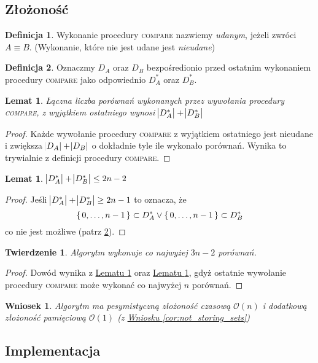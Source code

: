 \documentclass{scrartcl}
\theoremstyle{definition}
\theoremstyle{plain}
\theoremstyle{remark}
\theoremstyle{plain}
\theoremstyle{definition}
\newtheorem{def_success_compare}{Definicja}[section]
\newtheorem{def_D_star}[def_success_compare]{Definicja}
\theoremstyle{plain}
\newtheorem{lemma_unsuccesful_comparisons}
[lemma_equiv_if_lex_min_eq]{Lemat}
\newtheorem{lemma_d_star_len}[lemma_equiv_if_lex_min_eq]{Lemat}
\newtheorem{complexity_theorem}[termination_theorem]{Twierdzenie}
\newtheorem{o_complexity}[not_storing_sets]{Wniosek}
\begin{document}
\subsection{Złożoność}
\begin{def_success_compare}
	\label{def:success_compare}
	Wykonanie procedury \textnormal{\textsc{compare}}
	nazwiemy \emph{udanym}, jeżeli zwróci \(A\equiv B\).
	(Wykonanie, które nie jest udane jest \emph{nieudane})
\end{def_success_compare}
\begin{def_D_star}
	\label{def:D_star}
	Oznaczmy \(D_A\) oraz \(D_B\)
	bezpośredionio przed ostatnim wykonaniem
	procedury \textnormal{\textsc{compare}}
	jako odpowiednio \(D_A^*\) oraz \(D_B^*\).
\end{def_D_star}
\begin{lemma_unsuccesful_comparisons}
	\label{lem:unsuccesful_comparisons}
	Łączna liczba porównań wykonanych przez
	wywołania procedury \textnormal{\textsc{compare}},
	z wyjątkiem ostatniego wynosi
	\(\abs{D_A^*}+\abs{D_B^*}\)
\end{lemma_unsuccesful_comparisons}
\begin{proof}
	Każde wywołanie procedury \textsc{compare}
	z wyjątkiem ostatniego jest nieudane
	i zwiększa \(\abs{D_A}+\abs{D_B}\)
	o dokładnie tyle ile wykonało porównań.
	Wynika to trywialnie z definicji
	procedury \textsc{compare}.
\end{proof}
\begin{lemma_d_star_len}
	\label{lem:d_star_len}
	\(\abs{D_A^*}+\abs{D_B^*}\leq2n-2\)
\end{lemma_d_star_len}
\begin{proof}
	Jeśli \(\abs{D_A^*}+\abs{D_B^*}\ge2n-1\)
	to oznacza, że
	\[\set{0,\dots,n-1}\subset D_A^* \lor
		\set{0,\dots,n-1}\subset D_B^*\]
	co nie jest możliwe (patrz \cref{def:D_star}).
\end{proof}
\begin{complexity_theorem}
	Algorytm wykonuje co najwyżej \(3n-2\) porównań.
\end{complexity_theorem}
\begin{proof}
	Dowód wynika z
	\hyperref[lem:unsuccesful_comparisons]
	{Lematu \ref*{lem:unsuccesful_comparisons}}
	oraz
	\hyperref[lem:d_star_len]{Lematu \ref*{lem:d_star_len}},
	gdyż ostatnie wywołanie procedury \textsc{compare}
	może wykonać co najwyżej \(n\) porównań.
\end{proof}
\begin{o_complexity}
	Algorytm ma pesymistyczną złożoność czasową \(\mathcal{O}(n)\)
	i dodatkową złożoność pamięciową \(\mathcal{O}(1)\)%
	(z \hyperref[cor:not_storing_sets]
	{Wniosku \ref*{cor:not_storing_sets}})
\end{o_complexity}
\pagebreak
\subsection{Implementacja}
\inputminted{python3}{../implementacje/fast.py}
\pagebreak
\printbibliography[heading=bibintoc]
\end{document}
